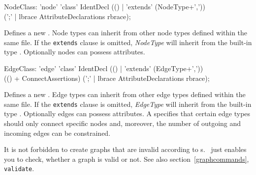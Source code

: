 \begin{rail}  
  NodeClass: 'node' 'class' IdentDecl (() | 'extends' (NodeType+',')) \\ 
    (';' | lbrace AttributeDeclarations rbrace);
\end{rail}
Defines a new . Node types can inherit from other node types defined within the same file. If the \texttt{extends} clause is omitted, \emph{NodeType} will inherit from the built-in type \texttt{}. Optionally nodes can possess attributes.

\begin{rail}    
  EdgeClass: 'edge' 'class' IdentDecl (() | 'extends' (EdgeType+',')) \\
    (() + ConnectAssertions) (';' | lbrace AttributeDeclarations rbrace);
\end{rail}
Defines a new . Edge types can inherit from other edge types defined within the same file. If the \texttt{extends} clause is omitted, \emph{EdgeType} will inherit from the built-in type \texttt{}. Optionally edges can possess attributes. A  specifies that certain edge types should only connect specific nodes and, moreover, the number of outgoing and incoming edges can be constrained.

\begin{note}
It is not forbidden to create graphs that are invalid according to s. \GrG\ just enables you to check, whether a graph is valid or not. See also section~\ref{graphcommands}, \texttt{validate}.
\end{note}

